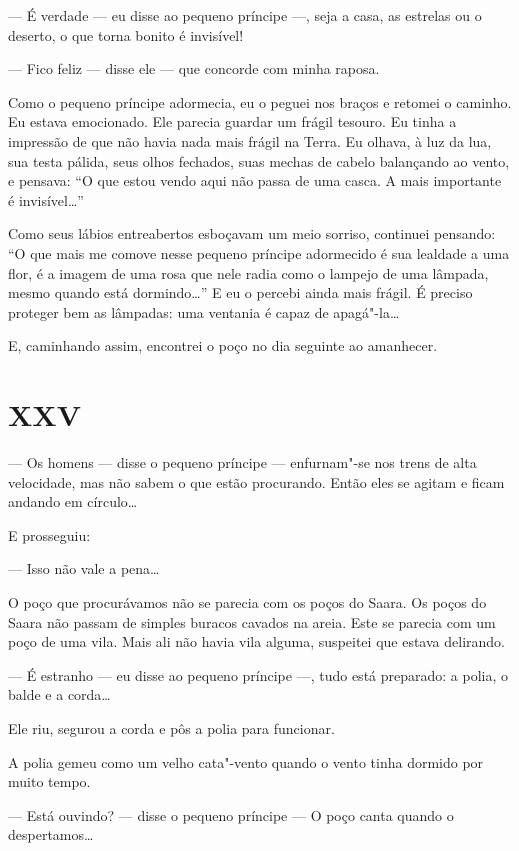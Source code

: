 \begin{Parallel}[p]{}{}
{--- É verdade --- eu disse ao pequeno príncipe ---, seja a casa, as estrelas
ou o deserto, o que torna bonito é invisível!

--- Fico feliz --- disse ele --- que concorde com minha raposa.

Como o pequeno príncipe adormecia, eu o peguei nos braços e retomei o
caminho. Eu estava emocionado. Ele parecia guardar um frágil tesouro. Eu
tinha a impressão de que não havia nada mais frágil na Terra. Eu olhava,
à luz da lua, sua testa pálida, seus olhos fechados, suas mechas de
cabelo balançando ao vento, e pensava: ``O que estou vendo aqui não
passa de uma casca. A mais importante é invisível\ldots{}''

Como seus lábios entreabertos esboçavam um meio sorriso, continuei
pensando: ``O que mais me comove nesse pequeno príncipe adormecido é sua
lealdade a uma flor, é a imagem de uma rosa que nele radia como o
lampejo de uma lâmpada, mesmo quando está dormindo\ldots{}'' E eu o percebi
ainda mais frágil. É preciso proteger bem as lâmpadas: uma ventania é
capaz de apagá"-la\ldots{}

E, caminhando assim, encontrei o poço no dia seguinte ao amanhecer.

\section{XXV}

--- Os homens --- disse o pequeno príncipe --- enfurnam"-se nos trens de alta
velocidade, mas não sabem o que estão procurando. Então eles se agitam e
ficam andando em círculo\ldots{}

E prosseguiu:

--- Isso não vale a pena\ldots{}

O poço que procurávamos não se parecia com os poços do Saara. Os poços
do Saara não passam de simples buracos cavados na areia. Este se parecia
com um poço de uma vila. Mais ali não havia vila alguma, suspeitei que
estava delirando.

--- É estranho --- eu disse ao pequeno príncipe ---, tudo está preparado: a
polia, o balde e a corda\ldots{}

Ele riu, segurou a corda e pôs a polia para funcionar.

A polia gemeu como um velho cata"-vento quando o vento tinha dormido por
muito tempo.

--- Está ouvindo? --- disse o pequeno príncipe --- O poço canta quando o
despertamos\ldots{}

}
\end{Parallel}
